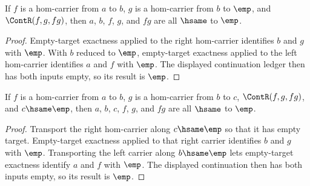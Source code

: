 \begin{theorem}
\label{thm:category-hom-carrier-empty-target-composite-boundary-inversion}
If $f$ is a hom-carrier from $a$ to $b$, $g$ is a hom-carrier from $b$ to
$\emp$, and $\ContR(f,g,fg)$, then $a$, $b$, $f$, $g$, and $fg$ are all
$\hsame$ to $\emp$.
\end{theorem}
\begin{proof}
Empty-target exactness applied to the right hom-carrier identifies $b$ and
$g$ with $\emp$. With $b$ reduced to $\emp$, empty-target exactness applied to
the left hom-carrier identifies $a$ and $f$ with $\emp$. The displayed
continuation ledger then has both inputs empty, so its result is $\emp$.
\end{proof}

\begin{theorem}
\label{thm:category-hom-carrier-comp-empty-target-boundary}
If $f$ is a hom-carrier from $a$ to $b$, $g$ is a hom-carrier from $b$ to
$c$, $\ContR(f,g,fg)$, and $c\hsame\emp$, then $a$, $b$, $c$, $f$, $g$, and
$fg$ are all $\hsame$ to $\emp$.
\end{theorem}
\begin{proof}
Transport the right hom-carrier along $c\hsame\emp$ so that it has empty
target. Empty-target exactness applied to that right carrier identifies $b$
and $g$ with $\emp$. Transporting the left carrier along $b\hsame\emp$ lets
empty-target exactness identify $a$ and $f$ with $\emp$. The displayed
continuation then has both inputs empty, so its result is $\emp$.
\end{proof}
